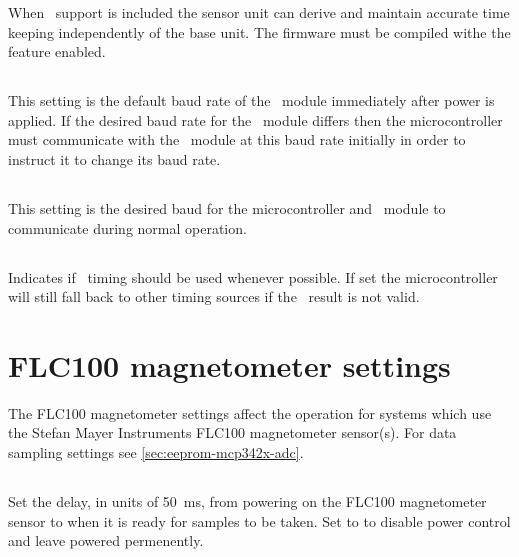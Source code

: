 When \gnss\ support is included the sensor unit can derive and
maintain accurate time keeping independently of the base unit. The
firmware must be compiled withe the  feature
enabled.

\subsection[gnss-default-baud-rate]{}

This setting is the default baud rate of the \gnss\ module immediately
after power is applied. If the desired baud rate for the \gnss\ module
differs then the microcontroller must communicate with the \gnss\
module at this baud rate initially in order to instruct it to change
its baud rate.

\subsection[gnss-desired-baud-rate]{}

This setting is the desired baud for the microcontroller and \gnss\
module to communicate during normal operation.

\subsection[use-gnss]{}

Indicates if \gnss\ timing should be used whenever possible. If set
the microcontroller will still fall back to other timing sources if
the \gnss\ result is not valid.

\section{FLC100 magnetometer settings}

The FLC100 magnetometer settings affect the operation for systems
which use the Stefan Mayer Instruments FLC100 magnetometer
sensor(s). For data sampling settings see
\ref{sec:eeprom-mcp342x-adc}.

\subsection[flc100-power-up-delay-50ms]{}
Set the delay, in units of \SI{50}{\milli\second}, from powering on
the FLC100 magnetometer sensor to when it is ready for samples to be
taken. Set to \code{0} to disable power control and leave powered
permenently.

